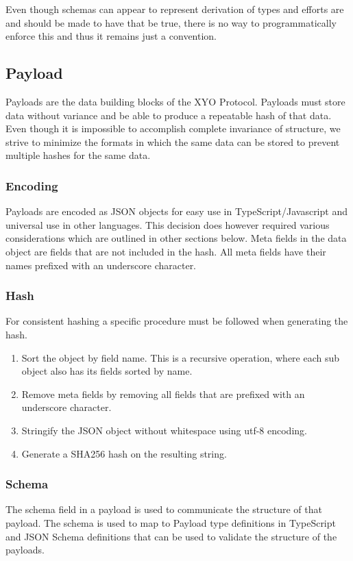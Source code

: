 \documentclass{article}
\begin{document}
Even though schemas can appear to represent derivation of types and efforts are and should be made to have that be true, there is no way to programmatically enforce this and thus it remains just a convention.

\subsection{Payload}
Payloads are the data building blocks of the XYO Protocol.  Payloads must store data without variance and be able to produce a repeatable hash of that data.  Even though it is impossible to accomplish complete invariance of structure, we strive to minimize the formats in which the same data can be stored to prevent multiple hashes for the same data.
\subsubsection{Encoding}
Payloads are encoded as JSON objects for easy use in TypeScript/Javascript and universal use in other languages.  This decision does however required various considerations which are outlined in other sections below. Meta fields in the data object are fields that are not included in the hash.  All meta fields have their names prefixed with an underscore character.

\subsubsection{Hash}
For consistent hashing a specific procedure must be followed when generating the hash.

\begin{enumerate}
    \item Sort the object by field name.  This is a recursive operation, where each sub object also has its fields sorted by name.
    \item Remove meta fields by removing all fields that are prefixed with an underscore character.
    \item Stringify the JSON object without whitespace using utf-8 encoding.
    \item Generate a SHA256 hash on the resulting string.
\end{enumerate}

\subsubsection{Schema}
The schema field in a payload is used to communicate the structure of that payload.  The schema is used to map to Payload type definitions in TypeScript and JSON Schema definitions that can be used to validate the structure of the payloads.
\end{document}
